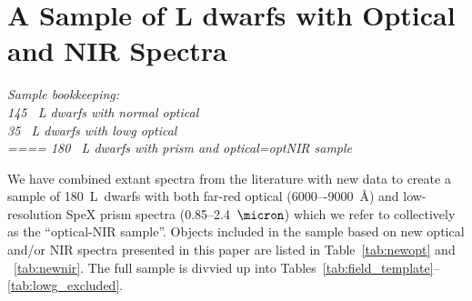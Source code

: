 \documentclass[12pt,preprint]{aastex}
\newcommand{\sample}{180}
\newcommand{\optNormal}{145}
\newcommand{\optLowG}{35}
\newcommand{\optNoisy}{13}
\newcommand{\optPec}{35}
\newcommand{\newopt}{19} %
\newcommand{\prismspectra}{140} %
\begin{document}
% 

\clearpage
\section{A Sample of L dwarfs with Optical and NIR Spectra}
\label{sec:sample}

\emph{Sample bookkeeping:\\
\optNormal~ L dwarfs with normal optical\\
\optLowG~ L dwarfs with lowg optical\\
====
\sample~ L dwarfs with prism and optical=optNIR sample\\
}

We have combined extant spectra from the literature with new data to create a sample of \sample~L~dwarfs with both far-red optical (6000–-9000~\AA) and low-resolution SpeX prism spectra (0.85--2.4~$\micron$) which we refer to collectively as the ``optical-NIR sample''. 
Objects included in the sample based on new optical and/or NIR spectra presented in this paper are listed in Table~\ref{tab:newopt} and ~\ref{tab:newnir}. 
The full sample is divvied up into Tables~\ref{tab:field_template}--\ref{tab:lowg_excluded}.
\end{document}
